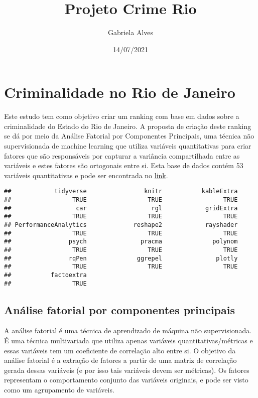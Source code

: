 \documentclass[
]{article}
\title{Projeto Crime Rio}
\author{Gabriela Alves}
\date{14/07/2021}
\begin{document}
\maketitle

\hypertarget{criminalidade-no-rio-de-janeiro}{%
\section{Criminalidade no Rio de
Janeiro}\label{criminalidade-no-rio-de-janeiro}}

Este estudo tem como objetivo criar um ranking com base em dados sobre a
criminalidade do Estado do Rio de Janeiro. A proposta de criação deste
ranking se dá por meio da Análise Fatorial por Componentes Principais,
uma técnica não supervisionada de machine learning que utiliza variáveis
quantitativas para criar fatores que são responsáveis por capturar a
variância compartilhada entre as variáveis e estes fatores são
ortogonais entre si. Esta base de dados contém 53 variáveis
quantitativas e pode ser encontrada no
\href{https://www.ispdados.rj.gov.br:4432/estatistica.html}{link}.

\begin{verbatim}
##            tidyverse                knitr           kableExtra 
##                 TRUE                 TRUE                 TRUE 
##                  car                  rgl            gridExtra 
##                 TRUE                 TRUE                 TRUE 
## PerformanceAnalytics             reshape2            rayshader 
##                 TRUE                 TRUE                 TRUE 
##                psych               pracma              polynom 
##                 TRUE                 TRUE                 TRUE 
##                rqPen              ggrepel               plotly 
##                 TRUE                 TRUE                 TRUE 
##           factoextra 
##                 TRUE
\end{verbatim}

\hypertarget{anuxe1lise-fatorial-por-componentes-principais}{%
\subsection{Análise fatorial por componentes
principais}\label{anuxe1lise-fatorial-por-componentes-principais}}

A análise fatorial é uma técnica de aprendizado de máquina não
supervisionada. É uma técnica multivariada que utiliza apenas variáveis
quantitativas/métricas e essas variáveis tem um coeficiente de
correlação alto entre si. O objetivo da análise fatorial é a extração de
fatores a partir de uma matriz de correlação gerada dessas variáveis (e
por isso tais variáveis devem ser métricas). Os fatores representam o
comportamento conjunto das variáveis originais, e pode ser visto como um
agrupamento de variáveis.
\end{document}
